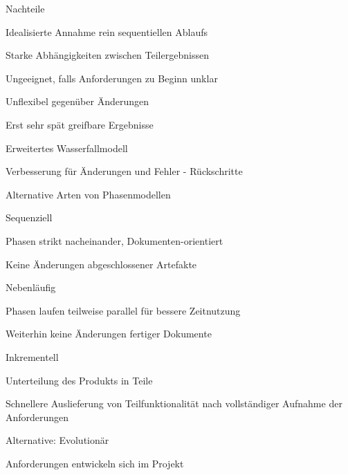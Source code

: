 \documentclass[a4paper]{article}
\begin{document}
\begin{multicols}{3}
\begin{itemize*}
\begin{itemize*}
      \item Nachteile
      \begin{itemize*}
        \item Idealisierte Annahme rein sequentiellen Ablaufs
        \item Starke Abhängigkeiten zwischen Teilergebnissen
        \item Ungeeignet, falls Anforderungen zu Beginn unklar
        \item Unflexibel gegenüber Änderungen
        \item Erst sehr spät greifbare Ergebnisse
      \end{itemize*}
    \end{itemize*}
    \item Erweitertes Wasserfallmodell
    \begin{itemize*}
      \item Verbesserung für Änderungen und Fehler - Rückschritte
    \end{itemize*}
    \item Alternative Arten von Phasenmodellen
    \begin{itemize*}
      \item Sequenziell
      \begin{itemize*}
        \item Phasen strikt nacheinander, Dokumenten-orientiert
        \item Keine Änderungen abgeschlossener Artefakte
      \end{itemize*}
      \item Nebenläufig
      \begin{itemize*}
        \item Phasen laufen teilweise parallel für bessere Zeitnutzung
        \item Weiterhin keine Änderungen fertiger Dokumente
      \end{itemize*}
      \item Inkrementell
      \begin{itemize*}
        \item Unterteilung des Produkts in Teile
        \item Schnellere Auslieferung von Teilfunktionalität nach vollständiger Aufnahme der Anforderungen
      \end{itemize*}
      \item Alternative: Evolutionär
      \begin{itemize*}
        \item Anforderungen entwickeln sich im Projekt

\end{itemize*}
\end{itemize*}
\end{itemize*}
\end{multicols}
\end{document}
